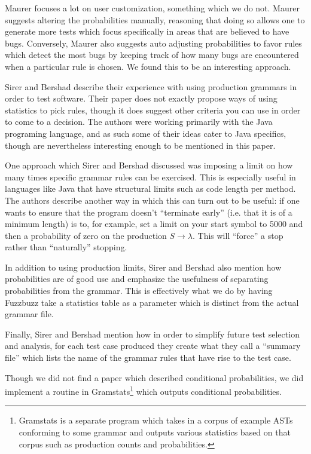 Maurer focuses a lot on user customization, something which we do not. Maurer
suggests altering the probabilities manually, reasoning that doing so allows
one to generate more tests which focus specifically in areas that are believed
to have bugs. Conversely, Maurer also suggests auto adjusting probabilities to
favor rules which detect the most bugs by keeping track of how many bugs are
encountered when a particular rule is chosen. We found this to be an interesting
approach.

Sirer and Bershad\cite{Bershad1999} describe their experience with using
production grammars in order to test software. Their paper does not exactly
propose ways of using statistics to pick rules, though it does suggest other
criteria you can use in order to come to a decision. The authors were working
primarily with the Java programing language, and as such some of their ideas
cater to Java specifics, though are nevertheless interesting enough to be
mentioned in this paper.

One approach which Sirer and Bershad discussed was imposing a limit on how many
times specific grammar rules can be exercised. This is especially useful in
languages like Java that have structural limits such as code length per
method. The authors describe another way in which this can turn out to be
useful: if one wants to ensure that the program doesn't ``terminate early''
(i.e. that it is of a minimum length) is to, for example, set a limit on your
start symbol to 5000 and then a probability of zero on the production $S
\rightarrow \lambda$. This will ``force'' a stop rather than ``naturally''
stopping.

In addition to using production limits, Sirer and Bershad also mention how
probabilities are of good use and emphasize the usefulness of separating
probabilities from the grammar. This is effectively what we do by having
Fuzzbuzz take a statistics table as a parameter which is distinct from the
actual grammar file.

Finally, Sirer and Bershad mention how in order to simplify future test
selection and analysis, for each test case produced they create what they call
a ``summary file'' which lists the name of the grammar rules that have rise to
the test case.

Though we did not find a paper which described conditional probabilities, we
did implement a routine in Gramstats\footnote{Gramstats is a separate program
which takes in a corpus of example ASTs conforming to some grammar and outputs
various statistics based on that corpus such as production counts and
probabilities.} which outputs conditional probabilities.

